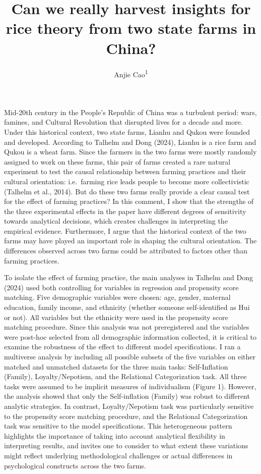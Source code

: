 \documentclass[
  man]{apa6}
\title{Can we really harvest insights for rice theory from two state farms in China?}
\author{Anjie Cao\textsuperscript{1}}
\date{}
\affiliation{\vspace{0.5cm}\textsuperscript{1} Stanford University}
\begin{document}
\maketitle

Mid-20th century in the People's Republic of China was a turbulent period: wars, famines, and Cultural Revolution that disrupted lives for a decade and more. Under this historical context, two state farms, Lianhu and Qukou were founded and developed. According to Talhelm and Dong (2024), Lianhu is a rice farm and Qukou is a wheat farm. Since the farmers in the two farms were mostly randomly assigned to work on these farms, this pair of farms created a rare natural experiment to test the causal relationship between farming practices and their cultural orientation: i.e.~farming rice leads people to become more collectivistic (Talhelm et al., 2014). But do these two farms really provide a clear causal test for the effect of farming practices? In this comment, I show that the strengths of the three experimental effects in the paper have different degrees of sensitivity towards analytical decisions, which creates challenges in interpreting the empirical evidence. Furthermore, I argue that the historical context of the two farms may have played an important role in shaping the cultural orientation. The differences observed across two farms could be attributed to factors other than farming practices.

To isolate the effect of farming practice, the main analyses in Talhelm and Dong (2024) used both controlling for variables in regression and propensity score matching. Five demographic variables were chosen: age, gender, maternal education, family income, and ethnicity (whether someone self-identified as Hui or not). All variables but the ethnicity were used in the propensity score matching procedure. Since this analysis was not preregistered and the variables were post-hoc selected from all demographic information collected, it is critical to examine the robustness of the effect to different model specifications. I ran a multiverse analysis by including all possible subsets of the five variables on either matched and unmatched datasets for the three main tasks: Self-Inflation (Family), Loyalty/Nepotism, and the Relational Categorization task. All three tasks were assumed to be implicit measures of individualism (Figure 1). However, the analysis showed that only the Self-inflation (Family) was robust to different analytic strategies. In contrast, Loyalty/Nepotism task was particularly sensitive to the propensity score matching procedure, and the Relational Categorization task was sensitive to the model specifications. This heterogeneous pattern highlights the importance of taking into account analytical flexibility in interpreting results, and invites one to consider to what extent these variations might reflect underlying methodological challenges or actual differences in psychological constructs across the two farms.
\end{document}
